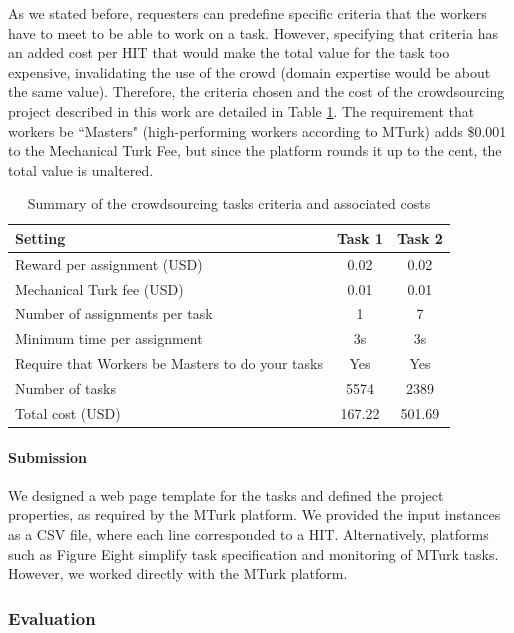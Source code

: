 As we stated before, requesters can predefine specific criteria that the workers have to meet to be able to work on a task. However, specifying that criteria has an added cost per HIT that would make the total value for the task too expensive, invalidating the use of the crowd (domain expertise would be about the same value). Therefore, the criteria chosen and the cost of the crowdsourcing project described in this work are detailed in Table \ref{tab2}. The requirement that workers be ``Masters" (high-performing workers according to MTurk) adds \$0.001 to the Mechanical Turk Fee, but since the platform rounds it up to the cent, the total value is unaltered.

\begin{table}[h]
\centering
\caption[Summary of the Crowdsourcing Tasks Criteria and Associated Costs]{Summary of the crowdsourcing tasks criteria and associated costs}\label{tab2}
\begin{tabular}{lcc}
\hline
Setting & Task 1 & Task 2 \\
\hline
Reward per assignment (USD) & 0.02 & 0.02 \\
Mechanical Turk fee (USD) & 0.01 & 0.01 \\
Number of assignments per task & 1 & 7 \\
Minimum time per assignment & 3s & 3s \\
Require that Workers be Masters to do your tasks & Yes & Yes \\
Number of tasks & 5574 & 2389 \\
Total cost (USD) & 167.22 & 501.69 \\
\hline
\end{tabular}
\end{table}

\paragraph{Submission}

We designed a web page template for the tasks and defined the project properties, as required by the MTurk platform. We provided the input instances as a CSV file, where each line corresponded to a HIT. Alternatively, platforms such as Figure Eight \citep{khare2015scaling} simplify task specification and monitoring of MTurk tasks. However, we worked directly with the MTurk platform.

\subsubsection{Evaluation}

